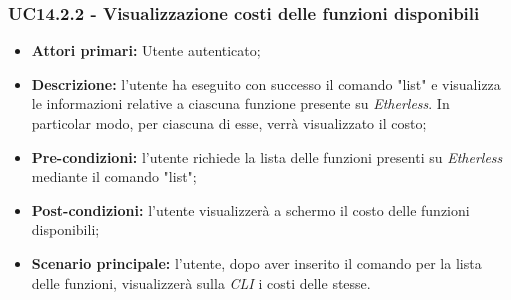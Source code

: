 \subsubsection{UC14.2.2 - Visualizzazione costi delle funzioni disponibili}
\begin{itemize}
	\item \textbf{Attori primari:} Utente autenticato;
	\item \textbf{Descrizione:} l'utente ha eseguito con successo il comando "list" e visualizza le informazioni relative a ciascuna funzione presente su \textit{Etherless}. In particolar modo, per ciascuna di esse, verrà visualizzato il costo; 
	\item \textbf{Pre-condizioni:} l'utente richiede la lista delle funzioni presenti su \textit{Etherless} mediante il comando "list"; 
	\item \textbf{Post-condizioni:} l'utente visualizzerà a schermo il costo delle funzioni disponibili;
	\item \textbf{Scenario principale:} l'utente, dopo aver inserito il comando per la lista delle funzioni, visualizzerà sulla \textit{CLI\glo} i costi delle stesse.
\end{itemize}